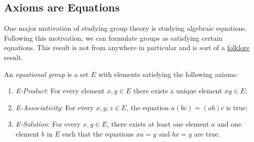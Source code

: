 \documentclass{article}
\begin{document}
\subsection*{Axioms are Equations}

One major motivation of studying group theory is studying algebraic equations.
Following this motivation, we can formulate groups as satisfying certain equations.
This result is not from anywhere in particular and is sort of a \href{https://en.wikipedia.org/wiki/Mathematical_folklore}{folklore} result.
\begin{defn}\label{defn:eq-grp}
  An \emph{equational group} is a set $E$ with elements satisfying the following axioms:
  \begin{enumerate}
  \item \emph{E-Product}: For every element $x, y \in E$ there exists a unique element $xy \in E$;
  \item \emph{E-Associativity}: For every $x, y, z \in E$, the equation $a(bc) = (ab)c$ is true;
  \item \emph{E-Solution}: For every $x, y \in E$, there exists at least one element $a$ and one element $b$ in $E$ such that the equations $xa = y$ and $bx = y$ are true.
  \end{enumerate}
\end{defn}
\end{document}
